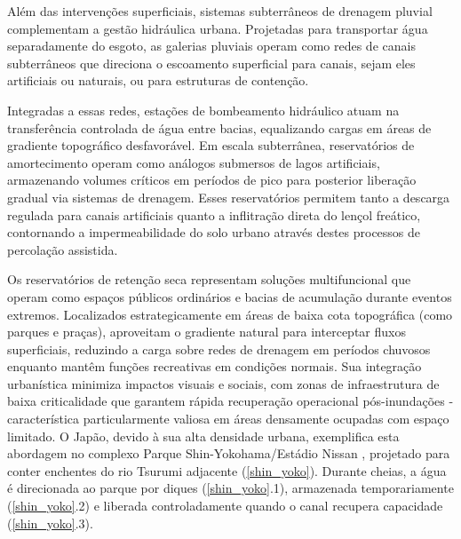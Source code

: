 Além das intervenções superficiais, sistemas subterrâneos de drenagem pluvial complementam a gestão hidráulica urbana.
Projetadas para transportar água separadamente do esgoto, as galerias pluviais operam como redes de canais subterrâneos
que direciona o escoamento superficial para canais, sejam eles artificiais ou naturais, ou para estruturas de contenção.


Integradas a essas redes, estações de bombeamento hidráulico atuam na transferência controlada de água entre bacias,
equalizando cargas em áreas de gradiente topográfico desfavorável. Em escala subterrânea, reservatórios de amortecimento
operam como análogos submersos de lagos artificiais, armazenando volumes críticos em períodos de pico para posterior
liberação gradual via sistemas de drenagem. Esses reservatórios permitem tanto a descarga regulada para canais
artificiais quanto a inflitração direta do lençol freático, contornando a impermeabilidade do solo urbano através destes
processos de percolação assistida.

Os reservatórios de retenção seca representam soluções multifuncional que operam como espaços públicos ordinários e
bacias de acumulação durante eventos extremos. Localizados estrategicamente em áreas de baixa cota topográfica (como
parques e praças), aproveitam o gradiente natural para interceptar fluxos superficiais, reduzindo a carga sobre redes de
drenagem em períodos chuvosos enquanto mantêm funções recreativas em condições normais. Sua integração urbanística
minimiza impactos visuais e sociais, com zonas de infraestrutura de baixa criticalidade que garantem rápida recuperação
operacional pós-inundações - característica particularmente valiosa em áreas densamente ocupadas com espaço limitado. O
Japão, devido à sua alta densidade urbana, exemplifica esta abordagem no complexo Parque Shin-Yokohama/Estádio Nissan
\cite{shinyokohamaplan}, projetado para conter enchentes do rio Tsurumi adjacente (\autoref{shin_yoko}). Durante cheias,
a água é direcionada ao parque por diques (\autoref{shin_yoko}.1), armazenada temporariamente (\autoref{shin_yoko}.2) e
liberada controladamente quando o canal recupera capacidade (\autoref{shin_yoko}.3).

